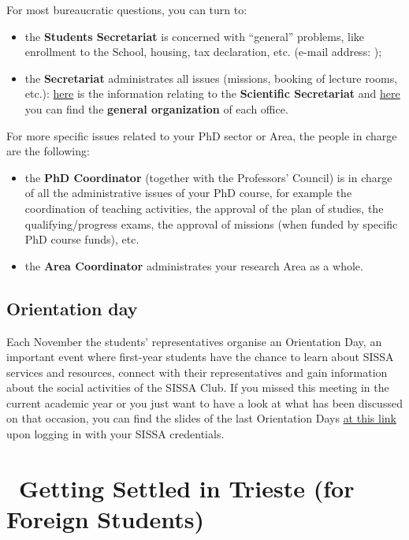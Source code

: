 \documentclass{sissavademecum}
\begin{document}
\noindent For most bureaucratic questions, you can turn to:
\begin{itemize}
	\item the \textbf{Students Secretariat} is concerned with ``general'' problems, like enrollment to the School, housing, tax declaration, etc. (e-mail address: );
	\item the \textbf{Secretariat} administrates all issues (missions, booking of lecture rooms, etc.): \href{https://www.sissa.it/scientific-secretariat}{here} is the information relating to the \textbf{Scientific Secretariat} and \href{https://www.sissa.it/articolazione-degli-uffici}{here} you can find the \textbf{general organization} of each office.
\end{itemize}
For more specific issues related to your PhD sector or Area, the people in charge are the following:
\begin{itemize}
	\item the \textbf{PhD Coordinator} (together with the Professors' Council) is in charge of all the administrative issues of your PhD course, for example the coordination of teaching activities, the approval of the plan of studies, the qualifying/progress exams, the approval of missions (when funded by specific PhD course funds), etc.
    \item the \textbf{Area Coordinator} administrates your research Area as a whole.
\end{itemize}


\section{Orientation day}
Each November the students' representatives organise an Orientation Day, an important event where first-year students have the chance to learn about SISSA services and resources, connect with their representatives and gain information about the social activities of the SISSA Club. If you missed this meeting in the current academic year or you just want to have a look at what has been discussed on that occasion, you can find the slides of the last Orientation Days \href{https://www.sissa.it/orientation-day}{at this link} upon logging in with your SISSA credentials.



\chapter{\texorpdfstring{\faHome\ }{}Getting Settled in Trieste (for Foreign Students)}
\end{document}
